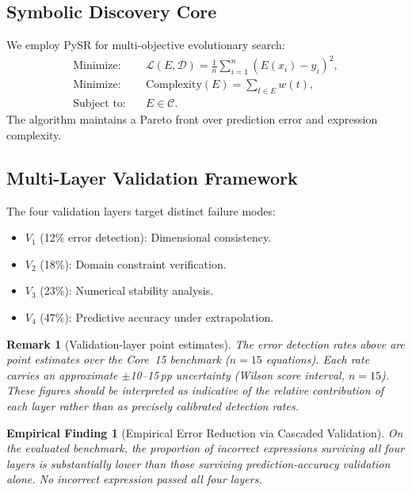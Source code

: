 \documentclass[twoside,11pt]{article}
\newtheorem{remark}[theorem]{Remark}
\newtheorem{finding}{Empirical Finding}
\begin{document}
\subsection{Symbolic Discovery Core}
\label{sec:arch_discovery}

We employ PySR \citep{cranmer2023pysr} for multi-objective evolutionary search:
\begin{align}
\text{Minimize:} \quad
& \mathcal{L}(E,\mathcal{D})
  = \frac{1}{n}\sum_{i=1}^n (E(x_i) - y_i)^2, \label{eq:loss}\\
\text{Minimize:} \quad
& \mathrm{Complexity}(E) = \sum_{t \in E} w(t), \label{eq:complexity}\\
\text{Subject to:} \quad
& E \in \mathcal{C}. \label{eq:constraints}
\end{align}
The algorithm maintains a Pareto front over prediction error and expression
complexity.

\subsection{Multi-Layer Validation Framework}
\label{sec:validation_detail}

The four validation layers target distinct failure modes:

\begin{itemize}
\item $V_1$ (12\% error detection): Dimensional consistency.
\item $V_2$ (18\%): Domain constraint verification.
\item $V_3$ (23\%): Numerical stability analysis.
\item $V_4$ (47\%): Predictive accuracy under extrapolation.
\end{itemize}

\begin{remark}[Validation-layer point estimates]
\label{rem:validation_ci}
The error detection rates above are point estimates over the Core~15 benchmark
($n=15$ equations).  Each rate carries an approximate $\pm$10--15\,pp
uncertainty (Wilson score interval, $n=15$).  These figures should be
interpreted as indicative of the relative contribution of each layer rather
than as precisely calibrated detection rates.
\end{remark}

\begin{finding}[Empirical Error Reduction via Cascaded Validation]
\label{prop:validation_reduction}
On the evaluated benchmark, the proportion of incorrect expressions surviving
all four layers is substantially lower than those surviving prediction-accuracy
validation alone.  No incorrect expression passed all four layers.
\end{finding}
\end{document}
